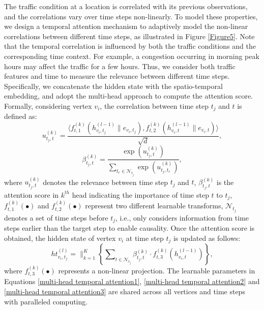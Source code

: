\documentclass[letterpaper]{article} \usepackage{aaai20}  \usepackage{times}  \usepackage{helvet} \usepackage{courier}  \usepackage[hyphens]{url}  \usepackage{graphicx} \usepackage{amsmath}
\begin{document}
The traffic condition at a location is correlated with its previous observations, and the correlations vary over time steps non-linearly. To model these properties, we design a temporal attention mechanism to adaptively model the non-linear correlations between different time steps, as illustrated in Figure \ref{Figure5}. Note that the temporal correlation is influenced by both the traffic conditions and the corresponding time context. For example, a congestion occurring in morning peak hours may affect the traffic for a few hours. Thus, we consider both traffic features and time to measure the relevance between different time steps. Specifically, we concatenate the hidden state with the spatio-temporal embedding, and adopt the multi-head approach to compute the attention score. Formally, considering vertex $ v_i $, the correlation between time step $ t_j $ and $ t $ is defined as:
\begin{equation}
u_{t_j,t}^{(k)} = \dfrac{ \langle f_{t,1}^{(k)} ( h_{v_i,t_j}^{(l-1)} \parallel e_{v_i,t_j} ), f_{t,2}^{(k)} ( h_{v_i,t}^{(l-1)} \parallel e_{v_i,t} ) \rangle }{\sqrt{d}}
\label{multi-head temporal attention1}, 
\end{equation}
\begin{equation}
\beta_{t_j,t}^{(k)} = \dfrac{ \exp ( u_{t_j,t}^{(k)} ) }{ \sum_{t_r \in \mathcal{N}_{t_j}} \exp ( u_{t_j,t_r}^{(k)} ) }
\label{multi-head temporal attention2},
\end{equation}
where $ u_{t_j,t}^{(k)} $ denotes the relevance between time step $ t_j $ and $ t $,  $ \beta_{t_j,t}^{(k)} $ is the attention score in $ k^{th} $ head indicating the importance of time step $ t $ to $ t_j $, $ f_{t,1}^{(k)} ( \bullet ) $ and $ f_{t,2}^{(k)} ( \bullet ) $ represent two different learnable transforms, $ \mathcal{N}_{t_j} $ denotes a set of time steps before $ t_j $, i.e., only considers information from time steps earlier than the target step to enable causality. Once the attention score is obtained, the hidden state of vertex $ v_i $ at time step $ t_j $ is updated as follows:
\begin{equation}
ht_{v_i,t_j}^{(l)} = \parallel_{k = 1}^K \left\{ \sum\nolimits_{t \in \mathcal{N}_{t_j}} \beta_{t_j,t}^{(k)} \cdot f_{t,3}^{(k)} ( h_{v_i,t}^{(l-1)} ) \right\}
\label{multi-head temporal attention3},
\end{equation}
where $ f_{t,3}^{(k)} ( \bullet ) $ represents a non-linear projection. The learnable parameters in Equations \ref{multi-head temporal attention1}, \ref{multi-head temporal attention2} and \ref{multi-head temporal attention3} are shared across all vertices and time steps with paralleled computing.
\end{document}
